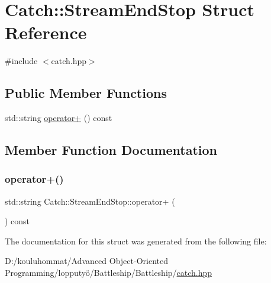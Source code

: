 \hypertarget{struct_catch_1_1_stream_end_stop}{}\section{Catch\+:\+:Stream\+End\+Stop Struct Reference}
\label{struct_catch_1_1_stream_end_stop}


{\ttfamily \#include $<$catch.\+hpp$>$}

\subsection*{Public Member Functions}
\begin{DoxyCompactItemize}
\item 
std\+::string \mbox{\hyperlink{struct_catch_1_1_stream_end_stop_a4a518f0342a381074821d5bda2651401}{operator+}} () const
\end{DoxyCompactItemize}


\subsection{Member Function Documentation}
\mbox{\label{struct_catch_1_1_stream_end_stop_a4a518f0342a381074821d5bda2651401}} 
\subsubsection{\texorpdfstring{operator+()}{operator+()}}
{\footnotesize\ttfamily std\+::string Catch\+::\+Stream\+End\+Stop\+::operator+ (\begin{DoxyParamCaption}{ }\end{DoxyParamCaption}) const}



The documentation for this struct was generated from the following file\+:\begin{DoxyCompactItemize}
\item 
D\+:/kouluhommat/\+Advanced Object-\/\+Oriented Programming/lopputyö/\+Battleship/\+Battleship/\mbox{\hyperlink{catch_8hpp}{catch.\+hpp}}\end{DoxyCompactItemize}
